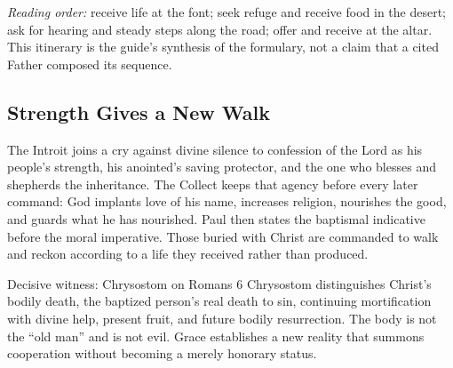 \begin{deepstudy}
\begin{center}
\end{center}

\noindent\emph{Reading order:} receive life at the font; seek refuge and receive food in the desert; ask for hearing and steady steps along the road; offer and receive at the altar. This itinerary is the guide's synthesis of the formulary, not a claim that a cited Father composed its sequence.

\sectionguard
\subsection*{Strength Gives a New Walk\enspace{}}

The Introit joins a cry against divine silence to confession of the Lord as his people's strength, his anointed's saving protector, and the one who blesses and shepherds the inheritance. The Collect keeps that agency before every later command: God implants love of his name, increases religion, nourishes the good, and guards what he has nourished. Paul then states the baptismal indicative before the moral imperative. Those buried with Christ are commanded to walk and reckon according to a life they received rather than produced.

\begin{studybox}{Decisive witness: Chrysostom on Romans 6}
Chrysostom distinguishes Christ's bodily death, the baptized person's real death to sin, continuing mortification with divine help, present fruit, and future bodily resurrection. The body is not the ``old man'' and is not evil. Grace establishes a new reality that summons cooperation without becoming a merely honorary status.
\end{studybox}


\end{deepstudy}
